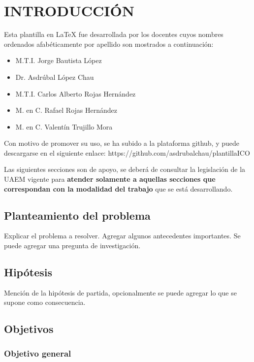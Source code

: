 \chapter{INTRODUCCIÓN}

Esta plantilla en \LaTeX{} fue desarrollada por los docentes cuyos nombres ordenados afabéticamente por apellido  son mostrados a continuación:

\begin{itemize}
\item M.T.I. Jorge Bautista López
\item Dr. Asdrúbal López Chau
\item M.T.I. Carlos Alberto Rojas Hernández
\item M. en C. Rafael Rojas Hernández
\item M. en C. Valentín Trujillo Mora
\end{itemize}

Con motivo de promover su uso, se ha subido a la plataforma github, y puede descargarse en el siguiente enlace: 
https://github.com/asdrubalchau/plantillaICO

Las siguientes secciones son de apoyo, se deberá de consultar la legislación de la UAEM vigente para \textbf{atender solamente a aquellas secciones que correspondan con la modalidad del trabajo} que se está desarrollando.

\section{Planteamiento del problema}

Explicar el problema a resolver. Agregar algunos antecedentes importantes.  Se puede agregar una pregunta de investigación.

\section{Hipótesis}

Mención de la hipótesis de partida, opcionalmente se puede agregar lo que se supone como consecuencia.

\section{Objetivos}

\subsection{Objetivo general}

